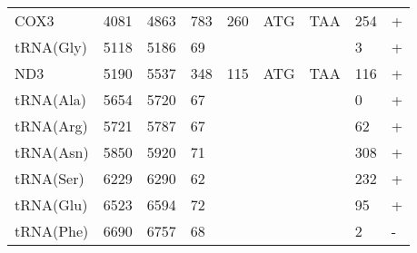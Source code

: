 \documentclass[../DISSERTACAO_MAIN.tex]{subfiles}
\begin{document}
\begin{longtable}{llllllllllllllllllllll}
			COX3         & 4081           & \multicolumn{2}{l}{4863}  & \multicolumn{2}{l}{783}        & \multicolumn{3}{l}{260}                       & \multicolumn{3}{l}{ATG}           & \multicolumn{3}{l}{TAA}   & \multicolumn{3}{l}{254}         & \multicolumn{4}{l}{+}                  \\
			tRNA(Gly)    & 5118           & \multicolumn{2}{l}{5186}  & \multicolumn{2}{l}{69}         & \multicolumn{3}{l}{}                          & \multicolumn{3}{l}{}              & \multicolumn{3}{l}{}      & \multicolumn{3}{l}{3}           & \multicolumn{4}{l}{+}                  \\
			ND3          & 5190           & \multicolumn{2}{l}{5537}  & \multicolumn{2}{l}{348}        & \multicolumn{3}{l}{115}                       & \multicolumn{3}{l}{ATG}           & \multicolumn{3}{l}{TAA}   & \multicolumn{3}{l}{116}         & \multicolumn{4}{l}{+}                  \\
			tRNA(Ala)    & 5654           & \multicolumn{2}{l}{5720}  & \multicolumn{2}{l}{67}         & \multicolumn{3}{l}{}                          & \multicolumn{3}{l}{}              & \multicolumn{3}{l}{}      & \multicolumn{3}{l}{0}           & \multicolumn{4}{l}{+}                  \\
			tRNA(Arg)    & 5721           & \multicolumn{2}{l}{5787}  & \multicolumn{2}{l}{67}         & \multicolumn{3}{l}{}                          & \multicolumn{3}{l}{}              & \multicolumn{3}{l}{}      & \multicolumn{3}{l}{62}          & \multicolumn{4}{l}{+}                  \\
			tRNA(Asn)    & 5850           & \multicolumn{2}{l}{5920}  & \multicolumn{2}{l}{71}         & \multicolumn{3}{l}{}                          & \multicolumn{3}{l}{}              & \multicolumn{3}{l}{}      & \multicolumn{3}{l}{308}         & \multicolumn{4}{l}{+}                  \\
			tRNA(Ser)    & 6229           & \multicolumn{2}{l}{6290}  & \multicolumn{2}{l}{62}         & \multicolumn{3}{l}{}                          & \multicolumn{3}{l}{}              & \multicolumn{3}{l}{}      & \multicolumn{3}{l}{232}         & \multicolumn{4}{l}{+}                  \\
			tRNA(Glu)    & 6523           & \multicolumn{2}{l}{6594}  & \multicolumn{2}{l}{72}         & \multicolumn{3}{l}{}                          & \multicolumn{3}{l}{}              & \multicolumn{3}{l}{}      & \multicolumn{3}{l}{95}          & \multicolumn{4}{l}{+}                  \\
			tRNA(Phe)    & 6690           & \multicolumn{2}{l}{6757}  & \multicolumn{2}{l}{68}         & \multicolumn{3}{l}{}                          & \multicolumn{3}{l}{}              & \multicolumn{3}{l}{}      & \multicolumn{3}{l}{2}           & \multicolumn{4}{l}{-}                  \\

\end{longtable}
\end{document}
